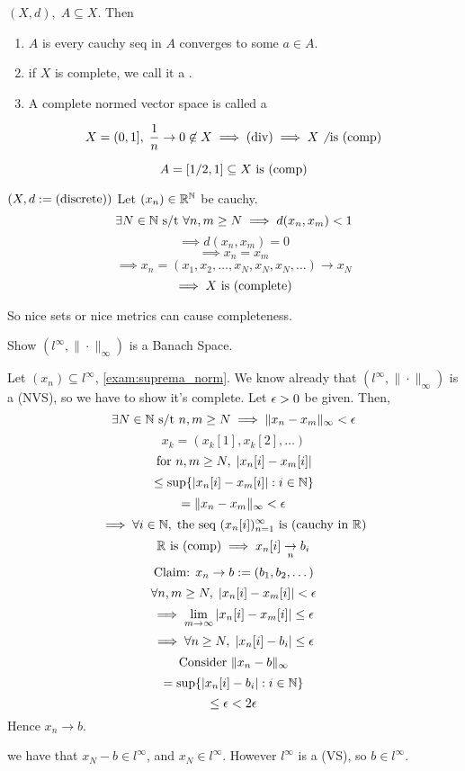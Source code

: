 \documentclass[12pt]{article}
\begin{document}
\bboxdefn
\begin{defn}\label{defn:complete_complete_metric_banach}
    \((X,d),\;A\subseteq X\). Then 
    \begin{enumerate}
        \item \(A\) is   every cauchy seq in \(A\) 
            converges to some \(a\in A\).
        \item if \(X\) is complete, we call it a .
        \item A complete normed vector space is called a 
    \end{enumerate}
\end{defn}
\ebox

\bboxexam
\begin{exam}
    \[X=(0,1],\;\frac1n\to0\not\in X\implies(\mathrm{div})\implies X\not\ \mathrm{is}\ (\mathrm{comp})\]
\end{exam}
\ebox

\bboxexam
\begin{exam}
    \[
        A=[1/2,1]\subseteq X\ \mathrm{is}\ (\mathrm{comp})
    \]
\end{exam}
\ebox

\bboxexam
\begin{exam}
    \((X,d:=(\mathrm{discrete}))\) Let \((x_n)\in\mathbb R^\mathbb N\) be cauchy.
    \[\exists N\in\mathbb N\text{ s/t }\forall n,m\ge N\implies d(x_n,x_m)<1\]
    \[\implies d(x_n,x_m)=0\]
    \[\implies x_n=x_m\]
    \[\implies x_n=(x_1,x_2,\dots,x_N,x_N,x_N,\dots)\to x_N\]
    \[\implies X\ \mathrm{is}\ (\mathrm{complete})\]
\end{exam}
\ebox

\bboxnote
\begin{note}
    So nice sets or nice metrics can cause completeness.
\end{note}
\ebox

\bboxexam
\begin{exam}
    Show \((l^\infty,\|\cdot\|_\infty)\) is a Banach Space.

    Let \((x_n)\subseteq l^\infty\), \cref{exam:suprema_norm}. We know already
    that \((l^\infty,\|\cdot\|_\infty)\) is a (NVS), so we have to
    show it's complete. Let \(\epsilon>0\) be given. Then,
    \[\exists N\in\mathbb N\text{ s/t } n,m\ge N\implies\|x_n-x_m\|_\infty<\epsilon\]
    \[x_k=(x_k[1],x_k[2],\dots)\]
    \[\text{for }n,m\ge N,\;|x_n[i]-x_m[i]|\]
    \[\le\sup\{|x_n[i]-x_m[i]|:i\in\mathbb N\}\]
    \[=\|x_n-x_m\|_\infty<\epsilon\]
    \[\implies\forall i\in\mathbb N,\;\text{the seq }(x_n[i])_{n=1}^\infty\ \mathrm{is}\ (\mathrm{cauchy\ in\ \mathbb R})\]
    \[\mathbb R\ \mathrm{is}\ (\mathrm{comp})\implies x_n[i]\underset n\to b_i\]
    \[\text{Claim: }x_n\to b:=(b_1,b_2,\dots)\]
    \[
        \forall n,m\ge N,\;
        |x_n[i]-x_m[i]|<\epsilon
    \]
    \[
        \implies\lim_{m\to\infty}|x_n[i]-x_m[i]|\le\epsilon
    \]
    \[
        \implies\forall n\ge N,\;
        |x_n[i]-b_i|\le\epsilon
    \]
    \[
        \text{Consider }\|x_n-b\|_\infty
    \]
    \[
        =\sup\{
            |x_n[i]-b_i|:i\in\mathbb N
        \}
    \]
    \[
        \le\epsilon<2\epsilon
    \]
    Hence \(x_n\to b\).

     we have that \(x_N-b\in l^\infty\), and \(x_N\in l^\infty\). However
    \(l^\infty\) is a (VS), so \(b\in l^\infty\).
\end{exam}
\ebox
\end{document}
